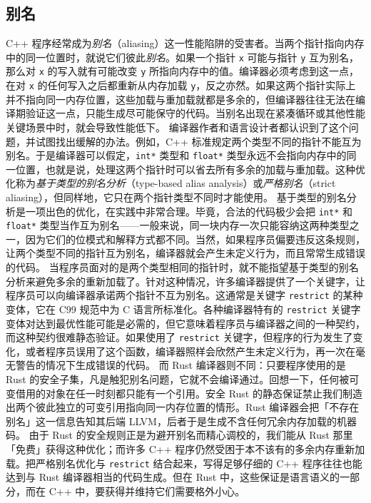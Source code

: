 \subsection{别名}
\label{idx:idx_6a337166}
\label{idx:idx_7aaf7177}
C++ 程序经常成为\emph{别名}（aliasing）这一性能陷阱的受害者。当两个指针指向内存中的同一位置时，就说它们彼此\emph{别名}。如果一个指针 \texttt{x} 可能与指针 \texttt{y} 互为别名，那么对 \texttt{x} 的写入就有可能改变 \texttt{y} 所指向内存中的值。编译器必须考虑到这一点，在对 \texttt{x} 的任何写入之后都重新从内存加载 \texttt{y}，反之亦然。如果这两个指针实际上并不指向同一内存位置，这些加载与重加载就都是多余的，但编译器往往无法在编译期验证这一点，只能生成尽可能保守的代码。当别名出现在紧凑循环或其他性能关键场景中时，就会导致性能低下。
\label{idx:idx_487b7ba5}
\label{idx:idx_574bf977}
编译器作者和语言设计者都认识到了这个问题，并试图找出缓解的办法。例如，C++ 标准规定两个类型不同的指针不能互为别名。于是编译器可以假定，\texttt{int*} 类型和 \texttt{float*} 类型永远不会指向内存中的同一位置，也就是说，处理这两个指针时可以省去所有多余的加载与重加载。这种优化称为\emph{基于类型的别名分析}（type-\allowbreak{}based alias analysis）或\emph{严格别名}（strict aliasing），但同样地，它只在两个指针类型不同时才能使用。
基于类型的别名分析是一项出色的优化，在实践中非常合理。毕竟，合法的代码极少会把 \texttt{int*} 和 \texttt{float*} 类型当作互为别名——一般来说，同一块内存一次只能容纳这两种类型之一，因为它们的位模式和解释方式都不同。当然，如果程序员偏要违反这条规则，让两个类型不同的指针互为别名，编译器就会产生未定义行为，而且常常生成错误的代码。
当程序员面对的是两个类型相同的指针时，就不能指望基于类型的别名分析来避免多余的重新加载了。针对这种情况，许多编译器提供了一个关键字，让程序员可以向编译器承诺两个指针不互为别名。这通常是关键字 \texttt{restrict} 的某种变体，它在 C99 规范中为 C 语言所标准化。各种编译器特有的 \texttt{restrict} 关键字变体对达到最优性能可能是必需的，但它意味着程序员与编译器之间的一种契约，而这种契约很难静态验证。如果使用了 \texttt{restrict} 关键字，但程序的行为发生了变化，或者程序员误用了这个函数，编译器照样会欣然产生未定义行为，再一次在毫无警告的情况下生成错误的代码。
\label{idx:idx_85a43e64}
而 Rust 编译器则不同：只要程序使用的是 Rust 的安全子集，凡是触犯别名问题，它就不会编译通过。回想一下，任何被可变借用的对象在任一时刻都只能有一个引用。安全 Rust 的静态保证禁止我们制造出两个彼此独立的可变引用指向同一内存位置的情形。Rust 编译器会把「不存在别名」这一信息告知其后端 LLVM，后者于是生成不含任何冗余内存加载的机器码。
由于 Rust 的安全规则正是为避开别名而精心调校的，我们能从 Rust 那里「免费」获得这种优化；而许多 C++ 程序仍然受困于本不该有的多余内存重新加载。把严格别名优化与 \texttt{restrict} 结合起来，写得足够仔细的 C++ 程序往往也能达到与 Rust 编译器相当的代码生成。但在 Rust 中，这些保证是语言语义的一部分，而在 C++ 中，要获得并维持它们需要格外小心。
